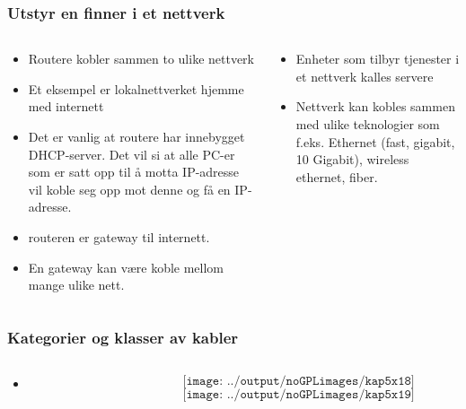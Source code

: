 \documentclass[aspectratio=169,xcolor=dvipsnames]{beamer}
\begin{document}
\begin{frame}
	\frametitle{Utstyr en finner i et nettverk}
	\begin{columns}
		\begin{column}{0.5\textwidth}

	\begin{itemize}
		\item Routere kobler sammen to ulike nettverk
		\item Et eksempel er lokalnettverket hjemme med internett
		\item Det er vanlig at routere har innebygget DHCP-server. Det vil si at alle PC-er som er satt opp til å motta IP-adresse vil koble seg opp mot denne og få en IP-adresse.
		\item routeren er gateway til internett. 
		\item En gateway kan være koble mellom mange ulike nett. 
	\end{itemize}

			
			
		\end{column}

		\begin{column}{0.5\textwidth}
			\begin{itemize}
				\item Enheter som tilbyr tjenester i et nettverk kalles servere
				\item Nettverk kan kobles sammen med ulike teknologier som f.eks. Ethernet (fast, gigabit, 10 Gigabit), wireless ethernet, fiber. 
			\end{itemize}

			
		\end{column}
	\end{columns}
\end{frame}
\begin{frame}
	\frametitle{Kategorier og klasser av kabler}
	\begin{columns}
		\begin{column}{0.5\textwidth}

			\begin{itemize}
				\item      
			\end{itemize}

			
		\end{column}

		\begin{column}{0.5\textwidth}
	$$\texttt{[image: ../output/noGPLimages/kap5x18]}$$
	$$\texttt{[image: ../output/noGPLimages/kap5x19]}$$
		\end{column}
	\end{columns}
\end{frame}
\end{document}
